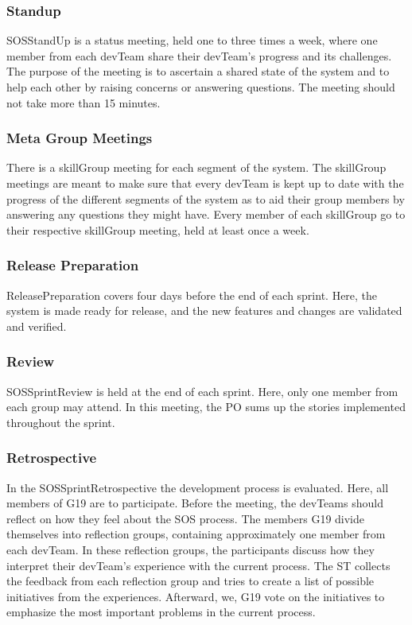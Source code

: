 \subsubsection{Standup}

\Gls{SOSStandUp} is a status meeting, held one to three times a week, where one member from each \gls{devTeam} share their \gls{devTeam}'s progress and its challenges. The purpose of the meeting is to ascertain a shared state of the system and to help each other by raising concerns or answering questions. The meeting should not take more than 15 minutes.

\subsubsection{Meta Group Meetings}

There is a \gls{skillGroup} meeting for each segment of the system. The \gls{skillGroup} meetings are meant to make sure that every \gls{devTeam} is kept up to date with the progress of the different segments of the system as to aid their group members by answering any questions they might have. Every member of each \gls{skillGroup} go to their respective \gls{skillGroup} meeting, held at least once a week.

\subsubsection{Release Preparation}

\Gls{ReleasePreparation} covers four days before the end of each sprint. Here, the system is made ready for release, and the new features and changes are validated and verified.

\subsubsection{Review}

\Gls{SOSSprintReview} is held at the end of each sprint. Here, only one member from each group may attend. In this meeting, the \gls{PO} sums up the stories implemented throughout the sprint.

\subsubsection{Retrospective}

In the \gls{SOSSprintRetrospective} the development process is evaluated. Here, all members of \gls{G19} are to participate. Before the meeting, the \glspl{devTeam} should reflect on how they feel about the \gls{SOS} process. The members \gls{G19} divide themselves into reflection groups, containing approximately one member from each \gls{devTeam}. In these reflection groups, the participants discuss how they interpret their \gls{devTeam}'s experience with the current process. The \gls{ST} collects the feedback from each reflection group and tries to create a list of possible initiatives from the experiences. Afterward, we, \gls{G19} vote on the initiatives to emphasize the most important problems in the current process.


